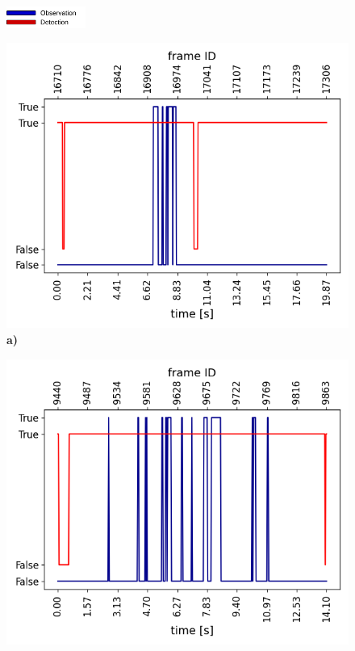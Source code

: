 \begin{figure}[h]
    \raggedright
    \includegraphics[width=0.23\textwidth]{images/dreyeve/gazes/glances_legend.png}\\
    \centering
    \begin{minipage}{0.5\textwidth}
        \centering
        \includegraphics[width=\textwidth]{images/dreyeve/gazes/1.png}
        \textbf{a)}
    \end{minipage}\hfill
    \begin{minipage}{0.5\textwidth}
        \centering
        \includegraphics[width=\textwidth]{images/dreyeve/gazes/2.png}

\end{minipage}
\end{figure}
